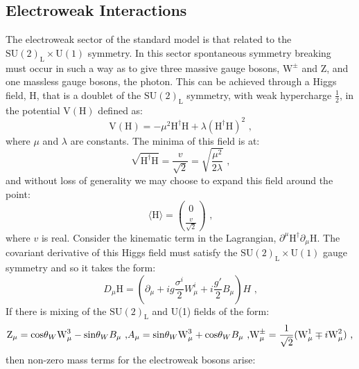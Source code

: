 \subsection{Electroweak Interactions}
The electroweak sector of the standard model is that related to the $\text{SU}(2)_{\text{L}} \times \text{U}(1)$ symmetry.  In this sector spontaneous symmetry breaking must occur in such a way as to give three massive gauge bosons,  $\text{W}^{\pm}$ and Z, and one massless gauge bosons, the photon.  This can be achieved through a Higgs field, H, that is a doublet of the $\text{SU}(2)_{\text{L}}$ symmetry, with weak hypercharge $\frac{1}{2}$, in the potential $\text{V}(\text{H})$ defined as:
%
\begin{equation}
\text{V}(\text{H}) = -\mu^{2}\text{H}^{\dagger}\text{H} + \lambda (\text{H}^{\dagger}\text{H})^{2} \text{ ,}
\end{equation}
%
\noindent where $\mu$ and $\lambda$ are constants.  The minima of this field is at:
%
\begin{equation}
\sqrt{\text{H}^{\dagger}\text{H}} = \frac{v}{\sqrt{2}} = \sqrt{\frac{\mu^{2}}{2\lambda}} \text{ ,}
\end{equation}
%
\noindent and without loss of generality we may choose to expand this field around the point:
%
\begin{equation}
\langle \text{H} \rangle = \binom{0}{\frac{v}{\sqrt{2}}} \text{ ,}
\end{equation}
%
\noindent where $v$ is real.  Consider the kinematic term in the Lagrangian, $\partial^{\mu} \text{H}^{\dagger} \partial_{\mu} \text{H}$.  The covariant derivative of this Higgs field must satisfy the $\text{SU}(2)_{\text{L}} \times \text{U}(1)$ gauge symmetry and so it takes the form:
%
\begin{equation}
D_{\mu} \text{H} = (\partial_{\mu} + ig\frac{\sigma^{i}}{2}W^{i}_{\mu} + i\frac{g'}{2}B_{\mu})H \text{ ,}
\end{equation}
%
\noindent If there is mixing of the $\text{SU}(2)_{\text{L}}$ and U(1) fields of the form:
%
\begin{equation}
\text{Z}_{\mu} = \text{cos}{\theta_{W}} \text{W}^{3}_{\mu} - \text{sin}{\theta_{W}} B_{\mu} \text{ ,}\\
A_{\mu} = \text{sin}{\theta_{W}} \text{W}^{3}_{\mu} + \text{cos}{\theta_{W}} B_{\mu} \text{ ,}\\
\text{W}^{\pm}_{\mu} = \frac{1}{\sqrt{2}}(\text{W}^{1}_{\mu} \mp i \text{W}^{2}_{\mu}) \text{ ,}
\end{equation}
%
\noindent then non-zero mass terms for the electroweak bosons arise:

